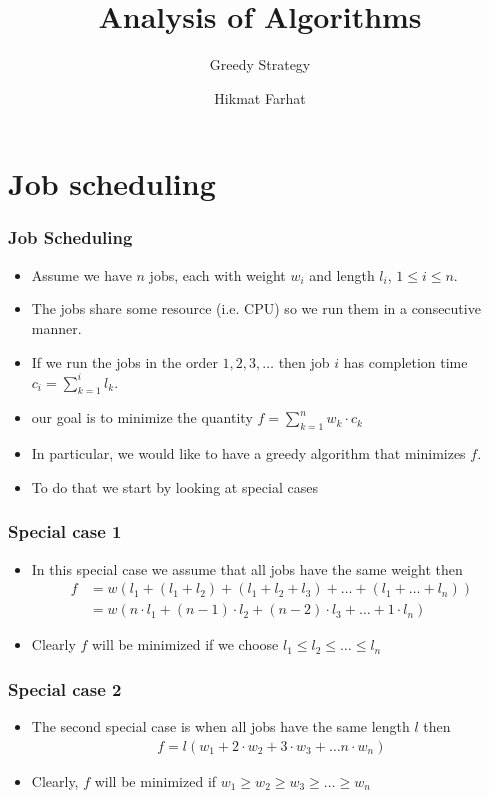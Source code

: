 \documentclass{beamer}
\title{ Analysis of Algorithms}
\subtitle{Greedy Strategy}
\author{Hikmat Farhat}
\begin{document}
\frame{\titlepage}



\section{Job scheduling}

\begin{frame}
  \frametitle{Job Scheduling}
  \begin{itemize}
  \item Assume we have $n$ jobs, each with weight $w_i$ and length $l_i$, $1\le i\le n$.
  \item The jobs share some resource (i.e. CPU) so we run them in a consecutive manner.
  \item If we run the jobs in the order $1,2,3,\dots$ then job $i$ has completion time $c_i=\sum_{k=1}^{i}l_k$.
  \item our goal is to minimize the quantity $f=\sum_{k=1}^n w_k\cdot c_k$
  \item In particular, we would like to have a greedy algorithm that minimizes $f$.
  \item To do that we start by looking at special cases
  \end{itemize}
\end{frame}
\begin{frame}
  \frametitle{Special case 1}
  \begin{itemize}
  \item In this special case we assume that all jobs have the same weight then
  \begin{align*}
f&=w(l_1+(l_1+l_2)+(l_1+l_2+l_3)+\ldots +(l_1+\dots+l_n))\\
 &=w(n\cdot l_1+(n-1)\cdot l_2+(n-2)\cdot l_3+\ldots +1\cdot l_n)
\end{align*}
\item Clearly $f$ will be minimized if we choose $l_1\le l_2\le\ldots\le l_n$
  \end{itemize}
\end{frame}
\begin{frame}
  \frametitle{Special case 2}
  \begin{itemize}
  \item The second special case is when all jobs have the same length $l$ then
    \begin{align*}
      f=l(w_1+2\cdot w_2+3\cdot w_3+\ldots n\cdot w_n)
    \end{align*}
\item Clearly, $f$ will be minimized if $w_1\ge w_2\ge w_3\ge\ldots\ge w_n$
  \end{itemize}
\end{frame}
\end{document}
